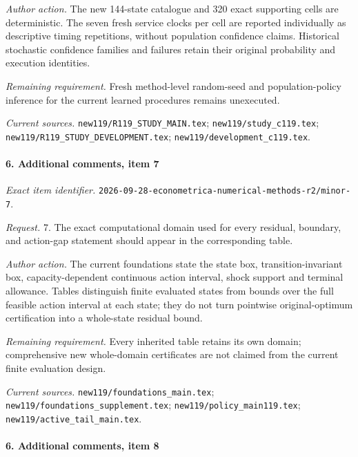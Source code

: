 \par\emph{Author action.} The new 144-state catalogue and 320 exact supporting cells are deterministic. The seven fresh service clocks per cell are reported individually as descriptive timing repetitions, without population confidence claims. Historical stochastic confidence families and failures retain their original probability and execution identities.

\par\emph{Remaining requirement.} Fresh method-level random-seed and population-policy inference for the current learned procedures remains unexecuted.

\par\emph{Current sources.} \nolinkurl{new119/R119_STUDY_MAIN.tex}; \nolinkurl{new119/study_c119.tex}; \nolinkurl{new119/R119_STUDY_DEVELOPMENT.tex}; \nolinkurl{new119/development_c119.tex}.

\paragraph{6. Additional comments, item 7}

\emph{Exact item identifier.} \nolinkurl{2026-09-28-econometrica-numerical-methods-r2/minor-7}.

\par\emph{Request.} 7. The exact computational domain used for every residual, boundary, and action-gap statement should appear in the corresponding table.

\par\emph{Author action.} The current foundations state the state box, transition-invariant box, capacity-dependent continuous action interval, shock support and terminal allowance. Tables distinguish finite evaluated states from bounds over the full feasible action interval at each state; they do not turn pointwise original-optimum certification into a whole-state residual bound.

\par\emph{Remaining requirement.} Every inherited table retains its own domain; comprehensive new whole-domain certificates are not claimed from the current finite evaluation design.

\par\emph{Current sources.} \nolinkurl{new119/foundations_main.tex}; \nolinkurl{new119/foundations_supplement.tex}; \nolinkurl{new119/policy_main119.tex}; \nolinkurl{new119/active_tail_main.tex}.

\paragraph{6. Additional comments, item 8}

